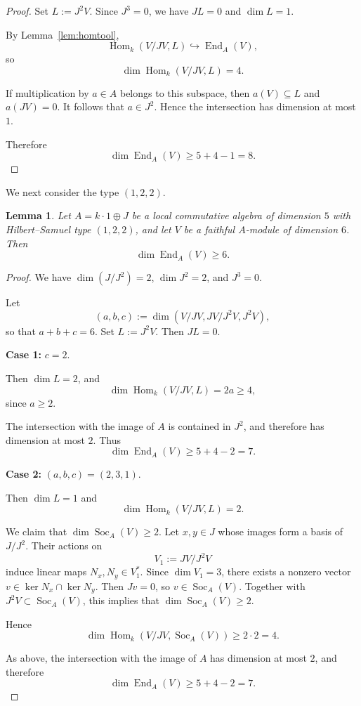 \documentclass[11pt]{article}
\DeclareMathOperator{\End}{End}
\DeclareMathOperator{\Hom}{Hom}
\DeclareMathOperator{\Soc}{Soc}
\theoremstyle{plain}
\newtheorem{lemma}{Lemma}
\theoremstyle{remark}
\begin{document}
\begin{proof}
	Set $L := J^2V$. Since $J^3 = 0$, we have $JL = 0$ and $\dim L = 1$.
	
	By Lemma~\ref{lem:homtool},
	\[
	\Hom_k(V/JV, L) \hookrightarrow \End_A(V),
	\]
	so
	\[
	\dim \Hom_k(V/JV, L) = 4.
	\]
	
	If multiplication by $a \in A$ belongs to this subspace, then $a(V) \subseteq L$ and $a(JV)=0$.
	It follows that $a \in J^2$. Hence the intersection has dimension at most $1$.
	
	Therefore
	\[
	\dim \End_A(V) \ge 5 + 4 - 1 = 8.
	\]
\end{proof}

We next consider the type $(1,2,2)$.

\begin{lemma}
	Let $A = k \cdot 1 \oplus J$ be a local commutative algebra of dimension $5$ with Hilbert--Samuel type
	$(1,2,2)$, and let $V$ be a faithful $A$-module of dimension $6$. Then
	\[
	\dim \End_A(V) \ge 6.
	\]
\end{lemma}

\begin{proof}
	We have $\dim(J/J^2)=2$, $\dim J^2 = 2$, and $J^3 = 0$.
	
	Let
	\[
	(a,b,c) := \dim(V/JV, JV/J^2V, J^2V),
	\]
	so that $a+b+c=6$. Set $L := J^2V$. Then $JL = 0$.
	
	\medskip
	\noindent
	\textbf{Case 1:} $c = 2$.
	
	Then $\dim L = 2$, and
	\[
	\dim \Hom_k(V/JV, L) = 2a \ge 4,
	\]
	since $a \ge 2$.
	
	The intersection with the image of $A$ is contained in $J^2$, and therefore has dimension at most $2$.
	Thus
	\[
	\dim \End_A(V) \ge 5 + 4 - 2 = 7.
	\]
	
	\medskip
	\noindent
	\textbf{Case 2:} $(a,b,c) = (2,3,1)$.
	
	Then $\dim L = 1$ and
	\[
	\dim \Hom_k(V/JV, L) = 2.
	\]
	
	We claim that $\dim \Soc_A(V) \ge 2$. Let $x,y \in J$ whose images form a basis of $J/J^2$.
	Their actions on
	\[
	V_1 := JV/J^2V
	\]
	induce linear maps $N_x, N_y \in V_1^*$. Since $\dim V_1 = 3$, there exists a nonzero vector
	$v \in \ker N_x \cap \ker N_y$. Then $Jv = 0$, so $v \in \Soc_A(V)$. Together with
	$J^2V \subset \Soc_A(V)$, this implies that $\dim \Soc_A(V) \ge 2$.
	
	Hence
	\[
	\dim \Hom_k(V/JV, \Soc_A(V)) \ge 2 \cdot 2 = 4.
	\]
	
	As above, the intersection with the image of $A$ has dimension at most $2$, and therefore
	\[
	\dim \End_A(V) \ge 5 + 4 - 2 = 7.
	\]
\end{proof}
\end{document}
